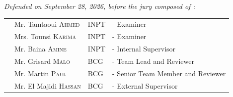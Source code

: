 \begin{center}
{\large \textit{Defended on September 28, 2026, before the jury composed of :}}\\[0.5cm]


\begin{tabular}{p{1cm}lll}
 & \large Mr.  Tamtaoui \textsc{Ahmed}  & \large INPT       & \large - Examiner   \\[0.1cm]
 & \large Mrs. Tounsi \textsc{Karima}  & \large INPT       & \large - Examiner   \\[0.1cm]
 & \large Mr.  Baina \textsc{Amine}  & \large INPT       & \large - Internal Supervisor \\[0.1cm]
 & \large Mr.  Grisard \textsc{Malo}  & \large BCG       & \large - Team Lead and Reviewer \\[0.1cm]
 & \large Mr.  Martin \textsc{Paul}  & \large BCG       & \large - Senior Team Member and Reviewer\\[0.1cm]
 & \large Mr.  El Majidi \textsc{Hassan}  & \large BCG       & \large - External Supervisor \\[0.1cm]
\end{tabular}

\vfill


\end{center}
